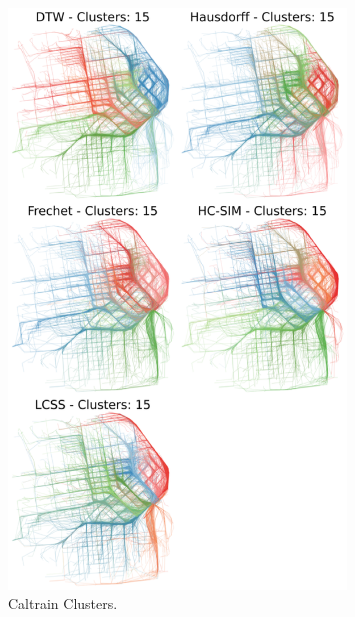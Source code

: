 \documentclass[a4paper, 12pt]{article}
\begin{document}
\begin{figure}[htbp!]
    \centering
    \includegraphics[width=0.8\textwidth]{Caltrain Plots.png}
    \caption{Caltrain Clusters.}
    \label{fig39}
\end{figure}
\end{document}
